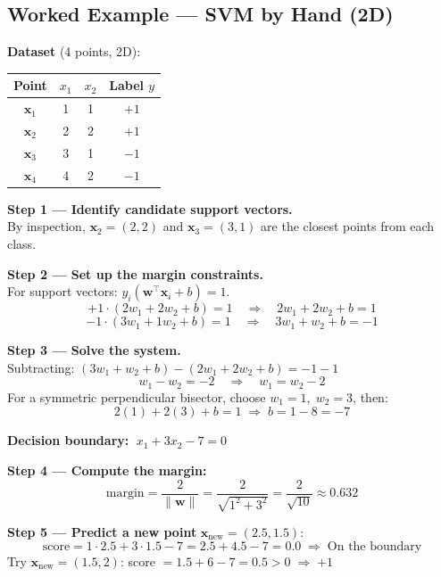 \documentclass[12pt,a4paper]{article}
\newcommand{\x}{\mathbf{x}}
\newcommand{\w}{\mathbf{w}}
\begin{document}
\subsection{Worked Example — SVM by Hand (2D)}

\begin{tcolorbox}[exbox, title={Example 3: Finding the Maximum-Margin Hyperplane}]
\textbf{Dataset} (4 points, 2D):

\begin{center}
\begin{tabular}{cccc}
\toprule
Point & $x_1$ & $x_2$ & Label $y$ \\
\midrule
$\x_1$ & 1 & 1 & $+1$ \\
$\x_2$ & 2 & 2 & $+1$ \\
$\x_3$ & 3 & 1 & $-1$ \\
$\x_4$ & 4 & 2 & $-1$ \\
\bottomrule
\end{tabular}
\end{center}

\textbf{Step 1 — Identify candidate support vectors.}\\
By inspection, $\x_2 = (2,2)$ and $\x_3 = (3,1)$ are the closest points from each class.

\textbf{Step 2 — Set up the margin constraints.}\\
For support vectors: $y_i(\w^\top\x_i + b) = 1$.
\[
  +1 \cdot (2w_1 + 2w_2 + b) = 1 \quad\Rightarrow\quad 2w_1 + 2w_2 + b = 1
\]
\[
  -1 \cdot (3w_1 + 1w_2 + b) = 1 \quad\Rightarrow\quad 3w_1 + w_2 + b = -1
\]

\textbf{Step 3 — Solve the system.}\\
Subtracting: $(3w_1+w_2+b)-(2w_1+2w_2+b) = -1-1$
\[
  w_1 - w_2 = -2 \quad\Rightarrow\quad w_1 = w_2 - 2
\]
For a symmetric perpendicular bisector, choose $w_1 = 1,\; w_2 = 3$, then:
\[
  2(1)+2(3)+b = 1 \;\Rightarrow\; b = 1-8 = -7
\]

\textbf{Decision boundary:} $\; x_1 + 3x_2 - 7 = 0$

\medskip
\textbf{Step 4 — Compute the margin:}
\[
  \text{margin} = \frac{2}{\|\w\|} = \frac{2}{\sqrt{1^2+3^2}} = \frac{2}{\sqrt{10}} \approx 0.632
\]

\textbf{Step 5 — Predict a new point} $\x_\text{new} = (2.5, 1.5)$:
\[
  \text{score} = 1\cdot2.5 + 3\cdot1.5 - 7 = 2.5 + 4.5 - 7 = 0.0 \;\Rightarrow\;\text{On the boundary}
\]
Try $\x_\text{new} = (1.5, 2)$: score $= 1.5+6-7 = 0.5 > 0 \;\Rightarrow\; \boxed{+1}$
\end{tcolorbox}
\end{document}
